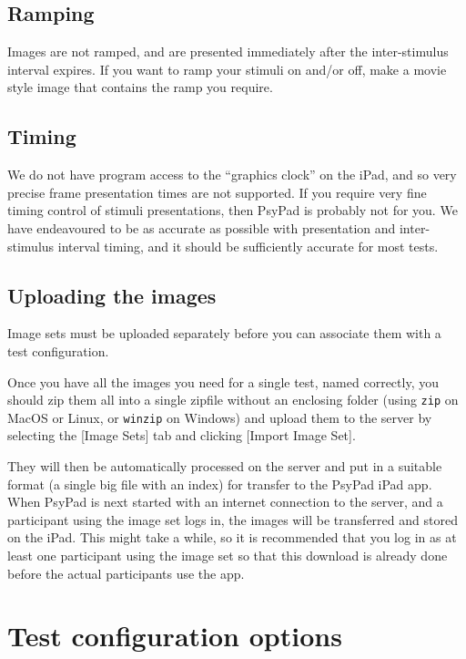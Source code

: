 \documentclass{article}
\begin{document}
\subsection{Ramping} 

Images are not ramped, and are presented
immediately after the inter-stimulus interval expires.  
If you want to ramp your stimuli on and/or off, make a movie style
image that contains the ramp you require.

\subsection{Timing} 

We do not have program access to the ``graphics clock'' on the iPad,
and so very precise frame presentation times are not supported.  If
you require very fine timing control of stimuli presentations, then
PsyPad is probably not for you.  We have endeavoured to be as
accurate as possible with presentation and inter-stimulus interval
timing, and it should be sufficiently accurate for most tests.

\subsection{Uploading the images}

Image sets must be uploaded separately before you can associate them with a test configuration.

Once you have all the images you need for a single test, named correctly,
you should zip them all into a single zipfile without an enclosing folder (using {\tt zip} on MacOS or Linux, or {\tt winzip} on Windows) and upload them to the server by selecting the [Image Sets] tab and clicking [Import Image Set].

They will then be automatically processed on the server and put in a suitable format (a single big file with an index) for transfer to the PsyPad iPad app. When PsyPad is next started with an internet connection to the server, and a participant using the image set logs in, the images will be transferred and stored on the iPad. This might take a while, so it is recommended that you log in as at least one participant using the 
image set so that this download is already done before the actual participants
use the app.

\section{Test configuration options}
\label{sec-tests}
\end{document}
